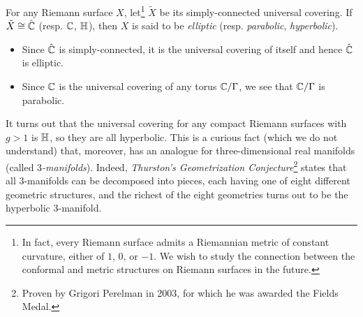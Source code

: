 \documentclass[../Moduli_Spaces_of_Riemann_Surfaces.tex]{subfiles}
\begin{document}
    \begin{remark}
        For any Riemann surface $X$, let\footnote{In fact, every Riemann surface admits a Riemannian metric of constant curvature, either of $1$, $0$, or $-1$. We wish to study the connection between the conformal and metric structures on Riemann surfaces in the future.} $\tilde{X}$ be its simply-connected universal covering. If $\tilde{X}\cong\hat{\mathbb{C}}$ (resp. $\mathbb{C}$, $\mathbb{H}$), then $X$ is said to be \textit{elliptic} (resp. \textit{parabolic}, \textit{hyperbolic}).
        \begin{itemize}
            \item Since $\hat{\mathbb{C}}$ is simply-connected, it is the universal covering of itself and hence $\hat{\mathbb{C}}$ is elliptic.
                \vspace{-0.05in}
            \item Since $\mathbb{C}$ is the universal covering of any torus $\mathbb{C}/\Gamma$, we see that $\mathbb{C}/\Gamma$ is parabolic.
        \end{itemize}
        It turns out that the universal covering for any compact Riemann surfaces with $g>1$ is $\mathbb{H}$, so they are all hyperbolic. This is a curious fact (which we do not understand) that, moreover, has an analogue for three-dimensional real manifolds (called \textit{$3$-manifolds}). Indeed, \textit{Thurston's Geometrization Conjecture}\footnote{Proven by Grigori Perelman in 2003, for which he was awarded the Fields Medal.} states that all $3$-manifolds can be decomposed into pieces, each having one of eight different geometric structures, and the richest of the eight geometries turns out to be the hyperbolic $3$-manifold.\exqed
    \end{remark}
\end{document}
